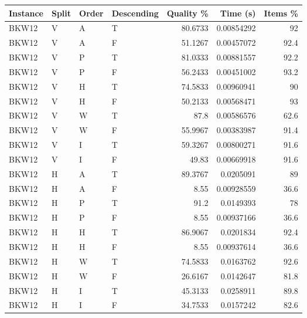 \begin{tabular}{llllrrr}
    \hline
    Instance & Split & Order & Descending & Quality \% & Time (s)   & Items \% \\
    \hline
    BKW12    & V     & A     & T          & 80.6733    & 0.00854292 & 92       \\
    BKW12    & V     & A     & F          & 51.1267    & 0.00457072 & 92.4     \\
    BKW12    & V     & P     & T          & 81.0333    & 0.00881557 & 92.2     \\
    BKW12    & V     & P     & F          & 56.2433    & 0.00451002 & 93.2     \\
    BKW12    & V     & H     & T          & 74.5833    & 0.00960941 & 90       \\
    BKW12    & V     & H     & F          & 50.2133    & 0.00568471 & 93       \\
    BKW12    & V     & W     & T          & 87.8       & 0.00586576 & 62.6     \\
    BKW12    & V     & W     & F          & 55.9967    & 0.00383987 & 91.4     \\
    BKW12    & V     & I     & T          & 59.3267    & 0.00800271 & 91.6     \\
    BKW12    & V     & I     & F          & 49.83      & 0.00669918 & 91.6     \\
    BKW12    & H     & A     & T          & 89.3767    & 0.0205091  & 89       \\
    BKW12    & H     & A     & F          & 8.55       & 0.00928559 & 36.6     \\
    BKW12    & H     & P     & T          & 91.2       & 0.0149393  & 78       \\
    BKW12    & H     & P     & F          & 8.55       & 0.00937166 & 36.6     \\
    BKW12    & H     & H     & T          & 86.9067    & 0.0201834  & 92.4     \\
    BKW12    & H     & H     & F          & 8.55       & 0.00937614 & 36.6     \\
    BKW12    & H     & W     & T          & 74.5833    & 0.0163762  & 92.6     \\
    BKW12    & H     & W     & F          & 26.6167    & 0.0142647  & 81.8     \\
    BKW12    & H     & I     & T          & 45.3133    & 0.0258911  & 89.8     \\
    BKW12    & H     & I     & F          & 34.7533    & 0.0157242  & 82.6     \\

\end{tabular}
